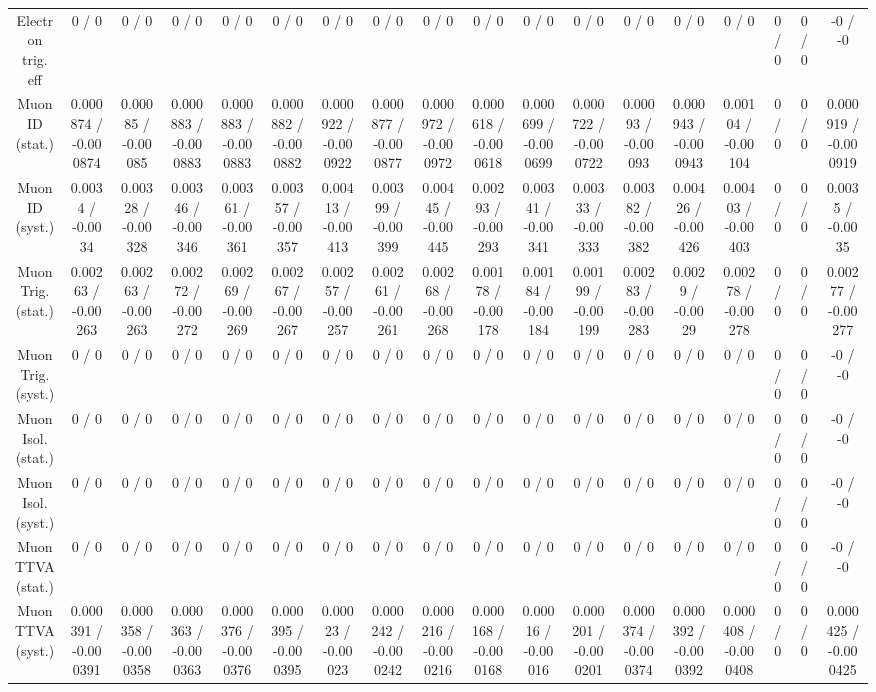 \documentclass[10pt]{article}
\begin{document}
\begin{table}[htbp]
\begin{center}
\begin{tabular}{|c|c|c|c|c|c|c|c|c|c|c|c|c|c|c|c|c|c|}
  Electron trig. eff & 0 / 0 & 0 / 0 & 0 / 0 & 0 / 0 & 0 / 0 & 0 / 0 & 0 / 0 & 0 / 0 & 0 / 0 & 0 / 0 & 0 / 0 & 0 / 0 & 0 / 0 & 0 / 0 & 0 / 0 & 0 / 0 & -0 / -0 \\ 
  Muon ID (stat.) & 0.000874 / -0.000874 & 0.00085 / -0.00085 & 0.000883 / -0.000883 & 0.000883 / -0.000883 & 0.000882 / -0.000882 & 0.000922 / -0.000922 & 0.000877 / -0.000877 & 0.000972 / -0.000972 & 0.000618 / -0.000618 & 0.000699 / -0.000699 & 0.000722 / -0.000722 & 0.00093 / -0.00093 & 0.000943 / -0.000943 & 0.00104 / -0.00104 & 0 / 0 & 0 / 0 & 0.000919 / -0.000919 \\ 
  Muon ID (syst.) & 0.0034 / -0.0034 & 0.00328 / -0.00328 & 0.00346 / -0.00346 & 0.00361 / -0.00361 & 0.00357 / -0.00357 & 0.00413 / -0.00413 & 0.00399 / -0.00399 & 0.00445 / -0.00445 & 0.00293 / -0.00293 & 0.00341 / -0.00341 & 0.00333 / -0.00333 & 0.00382 / -0.00382 & 0.00426 / -0.00426 & 0.00403 / -0.00403 & 0 / 0 & 0 / 0 & 0.0035 / -0.0035 \\ 
  Muon Trig. (stat.) & 0.00263 / -0.00263 & 0.00263 / -0.00263 & 0.00272 / -0.00272 & 0.00269 / -0.00269 & 0.00267 / -0.00267 & 0.00257 / -0.00257 & 0.00261 / -0.00261 & 0.00268 / -0.00268 & 0.00178 / -0.00178 & 0.00184 / -0.00184 & 0.00199 / -0.00199 & 0.00283 / -0.00283 & 0.0029 / -0.0029 & 0.00278 / -0.00278 & 0 / 0 & 0 / 0 & 0.00277 / -0.00277 \\ 
  Muon Trig. (syst.) & 0 / 0 & 0 / 0 & 0 / 0 & 0 / 0 & 0 / 0 & 0 / 0 & 0 / 0 & 0 / 0 & 0 / 0 & 0 / 0 & 0 / 0 & 0 / 0 & 0 / 0 & 0 / 0 & 0 / 0 & 0 / 0 & -0 / -0 \\ 
  Muon Isol. (stat.) & 0 / 0 & 0 / 0 & 0 / 0 & 0 / 0 & 0 / 0 & 0 / 0 & 0 / 0 & 0 / 0 & 0 / 0 & 0 / 0 & 0 / 0 & 0 / 0 & 0 / 0 & 0 / 0 & 0 / 0 & 0 / 0 & -0 / -0 \\ 
  Muon Isol. (syst.) & 0 / 0 & 0 / 0 & 0 / 0 & 0 / 0 & 0 / 0 & 0 / 0 & 0 / 0 & 0 / 0 & 0 / 0 & 0 / 0 & 0 / 0 & 0 / 0 & 0 / 0 & 0 / 0 & 0 / 0 & 0 / 0 & -0 / -0 \\ 
  Muon TTVA (stat.) & 0 / 0 & 0 / 0 & 0 / 0 & 0 / 0 & 0 / 0 & 0 / 0 & 0 / 0 & 0 / 0 & 0 / 0 & 0 / 0 & 0 / 0 & 0 / 0 & 0 / 0 & 0 / 0 & 0 / 0 & 0 / 0 & -0 / -0 \\ 
  Muon TTVA (syst.) & 0.000391 / -0.000391 & 0.000358 / -0.000358 & 0.000363 / -0.000363 & 0.000376 / -0.000376 & 0.000395 / -0.000395 & 0.00023 / -0.00023 & 0.000242 / -0.000242 & 0.000216 / -0.000216 & 0.000168 / -0.000168 & 0.00016 / -0.00016 & 0.000201 / -0.000201 & 0.000374 / -0.000374 & 0.000392 / -0.000392 & 0.000408 / -0.000408 & 0 / 0 & 0 / 0 & 0.000425 / -0.000425 \\ 

\end{tabular}
\end{center}
\end{table}
\end{document}
